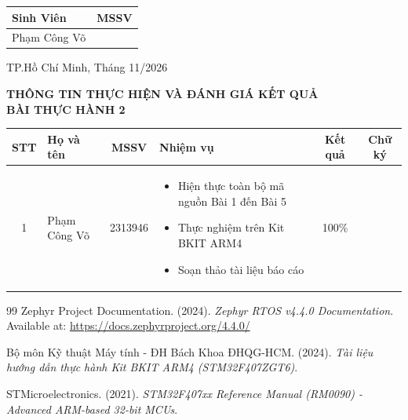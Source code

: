 \documentclass[a4paper]{article}
\begin{document}
\begin{titlepage}
\begin{center}
{\fontsize{13}{14}\selectfont
\begin{tabular}{|>{\centering\arraybackslash}p{7cm}|>{\centering\arraybackslash}p{4cm}|}
\hline
\textbf{Sinh Viên} & \textbf{MSSV} \\
\hline

Phạm Công Võ & 2313946 \\
\hline

\end{tabular}
}
\end{center}


\vspace{1.8cm}
\begin{center}
{\large TP.Hồ Chí Minh, Tháng 11/2026}
\end{center}
\end{titlepage}
\restoregeometry
\restoregeometry

\newpage
\begin{center}
    \textbf{\Large THÔNG TIN THỰC HIỆN VÀ ĐÁNH GIÁ KẾT QUẢ}\\[1ex]
    \textbf{\large BÀI THỰC HÀNH 2}
\end{center}

\vspace{1.5em}

\noindent
\begin{tabularx}{\textwidth}{|c|m{3cm}|c|X|c|c|}
\hline
\textbf{STT} & \textbf{\centering Họ và tên} & \textbf{MSSV} & \textbf{\centering Nhiệm vụ} & \textbf{Kết quả} & \textbf{Chữ ký} \\
\hline
1 & Phạm Công Võ & 2313946 & \begin{itemize}[leftmargin=*]
    \item Hiện thực toàn bộ mã nguồn Bài 1 đến Bài 5
    \item Thực nghiệm trên Kit BKIT ARM4
    \item Soạn thảo tài liệu báo cáo
\end{itemize} & 100\% & \\
\hline
\end{tabularx}

\newpage
\tableofcontents
\newpage



\newpage
{}
\begin{thebibliography}{99}
Zephyr Project Documentation. (2024). \textit{Zephyr RTOS v4.4.0 Documentation}. Available at: \url{https://docs.zephyrproject.org/4.4.0/}

Bộ môn Kỹ thuật Máy tính - ĐH Bách Khoa ĐHQG-HCM. (2024). \textit{Tài liệu hướng dẫn thực hành Kit BKIT ARM4 (STM32F407ZGT6)}.

STMicroelectronics. (2021). \textit{STM32F407xx Reference Manual (RM0090) - Advanced ARM-based 32-bit MCUs}.
\end{thebibliography}
\end{document}
